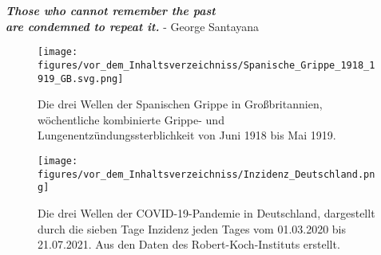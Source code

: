 \vspace*{15pt}
\begin{center}
    \huge{\textbf{
    \textit{Those who cannot remember the past\\ are condemned to repeat it.}}}
    \large{- George Santayana \autocite{history-quoteSantayana}}
\end{center}
\vspace*{65pt}
\begin{figure}[h]
    \centering
    \texttt{[image: figures/vor\_dem\_Inhaltsverzeichniss/Spanische\_Grippe\_1918\_1919\_GB.svg.png]}
    \caption{Die drei Wellen der \glqq{}Spanischen Grippe\grqq{} in Großbritannien, wöchentliche kombinierte Grippe- und Lungenentzündungssterblichkeit von Juni 1918 bis Mai 1919. \autocite{spanischflu}}
    \label{fig:spanishflu}
\end{figure}

\begin{figure}[h]
    \centering
    \texttt{[image: figures/vor\_dem\_Inhaltsverzeichniss/Inzidenz\_Deutschland.png]}
    \caption{Die drei Wellen der COVID-19-Pandemie in Deutschland, dargestellt durch die sieben Tage Inzidenz jeden Tages vom 01.03.2020 bis 21.07.2021. Aus den Daten des Robert-Koch-Instituts erstellt.}
    \label{fig:germany_incidence}
\end{figure}